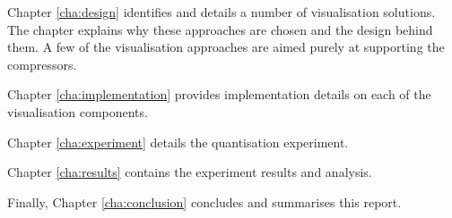 Chapter \ref{cha:design} identifies and details a number of visualisation
solutions. The chapter explains why these approaches are chosen and the design
behind them. A few of the visualisation approaches are aimed purely at
supporting the compressors.

Chapter \ref{cha:implementation} provides implementation details on each of the
visualisation components.

Chapter \ref{cha:experiment} details the quantisation experiment.

Chapter \ref{cha:results} contains the experiment results and analysis.

Finally, Chapter \ref{cha:conclusion} concludes and summarises this report.



